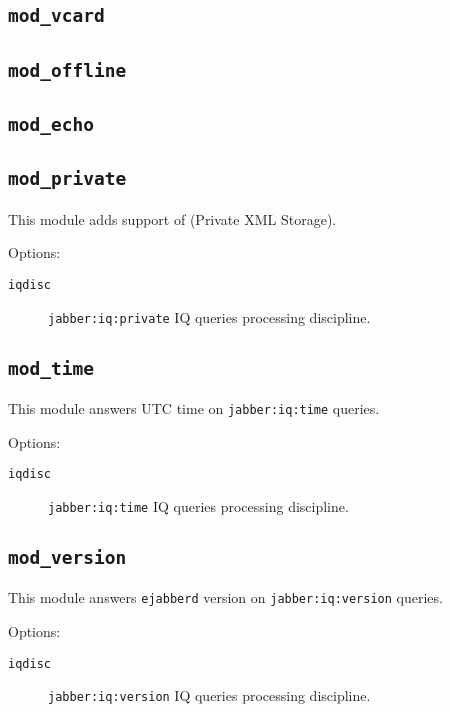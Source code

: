 \documentclass[10pt]{article}
\newcommand{\ns}[1]{\texttt{#1}}
\newcommand{\ejabberd}{\texttt{ejabberd}}
\newcommand{\modvcard}{\texttt{mod\_vcard}}
\newcommand{\modoffline}{\texttt{mod\_offline}}
\newcommand{\modecho}{\texttt{mod\_echo}}
\newcommand{\modprivate}{\texttt{mod\_private}}
\newcommand{\modtime}{\texttt{mod\_time}}
\newcommand{\modversion}{\texttt{mod\_version}}
\begin{document}
\subsection{\modvcard{}}
\label{sec:modvcard}



\subsection{\modoffline{}}
\label{sec:modoffline}



\subsection{\modecho{}}
\label{sec:modecho}



\subsection{\modprivate{}}
\label{sec:modprivate}

This module adds support of
 (Private XML
Storage).

Options:
\begin{description}
\item[\texttt{iqdisc}] \ns{jabber:iq:private} IQ queries processing discipline.
\end{description}

\subsection{\modtime{}}
\label{sec:modtime}

This module answers UTC time on \ns{jabber:iq:time} queries.

Options:
\begin{description}
\item[\texttt{iqdisc}] \ns{jabber:iq:time} IQ queries processing discipline.
\end{description}


\subsection{\modversion{}}
\label{sec:modversion}

This module answers \ejabberd{} version on \ns{jabber:iq:version} queries.

Options:
\begin{description}
\item[\texttt{iqdisc}] \ns{jabber:iq:version} IQ queries processing discipline.
\end{description}
\end{document}
